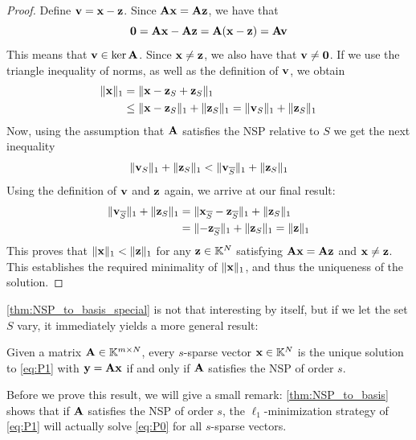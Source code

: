 \begin{proof}
	Define $ \mathbf{v} = \mathbf{x} - \mathbf{z} $. Since $ \mathbf{A}\mathbf{x} = \mathbf{A}\mathbf{z} $, we have that 
	\[
		\mathbf{0} = \mathbf{A}\mathbf{x} - \mathbf{A}\mathbf{z} = \mathbf{A}(\mathbf{x} -\mathbf{z}) = \mathbf{A}\mathbf{v}
	\]
	This means that $ \mathbf{v} \in \ker\mathbf{A} $. Since $ \mathbf{x}\neq\mathbf{z} $, we also have that $ \mathbf{v}\neq \mathbf{0} $. If we use the triangle inequality of norms, as well as the definition of $ \mathbf{v} $, we obtain
	\begin{align*}
	      \lVert\mathbf{x}\rVert_{1} 
		& = \lVert\mathbf{x} - \mathbf{z}_{S} + \mathbf{z}_{S}\rVert_{1} \\
		 & \leq \lVert\mathbf{x} - \mathbf{z}_{S}\rVert_{1} + \lVert\mathbf{z}_{S}\rVert_{1}
		= \lVert\mathbf{v}_{S}\rVert_{1} + \lVert\mathbf{z}_{S}\rVert_{1}
	\end{align*}
	Now, using the assumption that $ \mathbf{A} $ satisfies the NSP relative to $ S $ we get the next inequality
	\[
		\lVert\mathbf{v}_{S}\rVert_{1} + \lVert\mathbf{z}_{S}\rVert_{1} < \lVert\mathbf{v}_{\overline{S}}\rVert_{1} + \lVert\mathbf{z}_{S}\rVert_{1}
	\]
	Using the definition of $ \mathbf{v} $ and $ \mathbf{z} $ again, we arrive at our final result:
	\begin{align*}
		  \lVert\mathbf{v}_{\overline{S}}\rVert_{1} + \lVert\mathbf{z}_{S}\rVert_{1}
		&= \lVert\mathbf{x}_{\overline{S}} - \mathbf{z}_{\overline{S}}\rVert_{1} + \lVert\mathbf{z}_{S}\rVert_{1} \\
		&= \lVert- \mathbf{z}_{\overline{S}}\rVert_{1} + \lVert\mathbf{z}_{S}\rVert_{1}
		= \lVert\mathbf{z}\rVert_{1}
	\end{align*}
	This proves that $ \lVert\mathbf{x}\rVert_{1} < \lVert\mathbf{z}\rVert_{1} $ for any $ \mathbf{z} \in \mathbb{K}^{N} $ satisfying $ \mathbf{A}\mathbf{x} = \mathbf{A}\mathbf{z} $ and $ \mathbf{x} \neq \mathbf{z} $. This establishes the required minimality of $ \lVert\mathbf{x}\rVert_{1} $, and thus the uniqueness of the solution.
\end{proof}

\cref{thm:NSP_to_basis_special} is not that interesting by itself, but if we let the set $ S $ vary, it immediately yields a more general result:

\begin{corollary}
	\label{thm:NSP_to_basis}
	Given a matrix $ \mathbf{A} \in \mathbb{K}^{m \times N} $, every $ s $-sparse vector $ \mathbf{x} \in \mathbb{K}^{N} $ is the unique solution to \eqref{eq:P1} with $ \mathbf{y} = \mathbf{A}\mathbf{x} $ if and only if $ \mathbf{A} $ satisfies the NSP of order $ s $. 
\end{corollary}

Before we prove this result, we will give a small remark: \cref{thm:NSP_to_basis} shows that if $ \mathbf{A} $ satisfies the NSP of order $ s $, the $ \ell_{1} $-minimization strategy of \eqref{eq:P1} will actually solve \eqref{eq:P0} for all $ s $-sparse vectors.

